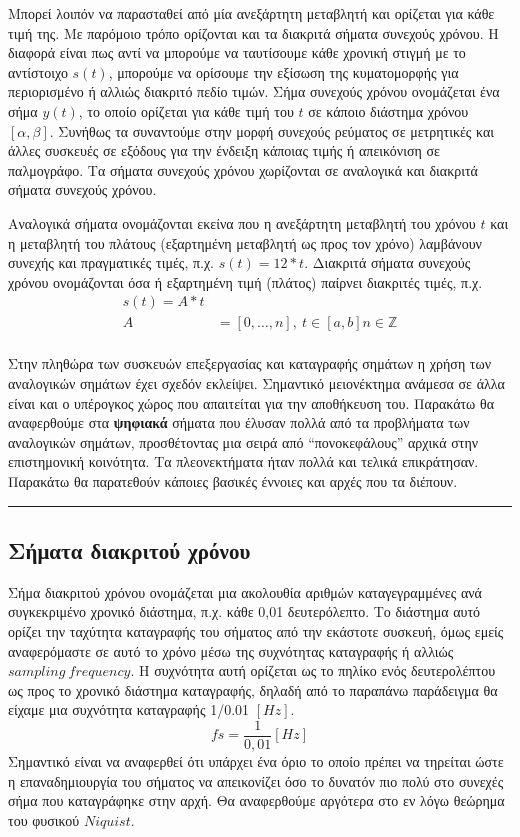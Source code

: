 \documentclass[breaklines=true, 12pt]{article}
\begin{document}
Μπορεί λοιπόν να παρασταθεί από μία ανεξάρτητη μεταβλητή και ορίζεται για κάθε
τιμή της. Με παρόμοιο τρόπο ορίζονται και τα διακριτά σήματα συνεχούς χρόνου.
Η διαφορά είναι πως αντί να μπορούμε να ταυτίσουμε κάθε χρονική στιγμή με το
αντίστοιχο \(s(t)\), μπορούμε να ορίσουμε την εξίσωση της κυματομορφής για
περιορισμένο ή αλλιώς διακριτό πεδίο τιμών. Σήμα συνεχούς χρόνου
ονομάζεται ένα σήμα \(y(t)\), το οποίο ορίζεται για κάθε τιμή του \(t\) σε κάποιο
διάστημα χρόνου \([\alpha,\beta]\). Συνήθως τα συναντούμε στην μορφή συνεχούς ρεύματος σε
μετρητικές και άλλες συσκευές σε εξόδους για την ένδειξη κάποιας τιμής ή
απεικόνιση σε παλμογράφο. Τα σήματα συνεχούς χρόνου χωρίζονται σε αναλογικά
και διακριτά σήματα συνεχούς χρόνου.

Αναλογικά σήματα ονομάζονται εκείνα που η ανεξάρτητη μεταβλητή του
χρόνου \(t\) και η μεταβλητή του πλάτους (εξαρτημένη μεταβλητή ως προς τον
χρόνο) λαμβάνουν συνεχής και πραγματικές τιμές, π.χ. \(s(t) = 12 * t\).
Διακριτά σήματα συνεχούς χρόνου ονομάζονται όσα ή εξαρτημένη τιμή
(πλάτος) παίρνει διακριτές τιμές, π.χ.
\begin{equation}
\begin{align}
s(t) =  A * t \\
A &= [0, … ,n],\ t \in [a,b] n \in \mathbb{Z} \\
\end{align}
\end{equation}

Στην πληθώρα των συσκευών επεξεργασίας και καταγραφής σημάτων η χρήση
των αναλογικών σημάτων έχει σχεδόν εκλείψει. Σημαντικό μειονέκτημα
ανάμεσα σε άλλα είναι και ο υπέρογκος χώρος που απαιτείται
για την αποθήκευση του. Παρακάτω θα αναφερθούμε στα \textbf{ψηφιακά} σήματα που
έλυσαν πολλά από τα προβλήματα των αναλογικών σημάτων, προσθέτοντας μια
σειρά από “πονοκεφάλους” αρχικά στην επιστημονική κοινότητα. Τα
πλεονεκτήματα ήταν πολλά και τελικά επικράτησαν. Παρακάτω θα παρατεθούν
κάποιες βασικές έννοιες και αρχές που τα διέπουν.

\noindent\rule{\textwidth}{0.5pt}
\subsection{Σήματα διακριτού χρόνου}
\label{sec:org9fc30b3}
Σήμα διακριτού χρόνου ονομάζεται μια ακολουθία αριθμών καταγεγραμμένες
ανά συγκεκριμένο χρονικό διάστημα, π.χ. κάθε 0,01 δευτερόλεπτο. Το
διάστημα αυτό ορίζει την ταχύτητα καταγραφής του σήματος από την
εκάστοτε συσκευή, όμως εμείς αναφερόμαστε σε αυτό το χρόνο μέσω της
συχνότητας καταγραφής ή αλλιώς \({sampling\ frequency}\). Η συχνότητα αυτή
ορίζεται ως το πηλίκο ενός δευτερολέπτου ως προς το χρονικό διάστημα
καταγραφής, δηλαδή από το παραπάνω παράδειγμα θα είχαμε μια συχνότητα
καταγραφής 1/0.01 \([Hz]\).
\begin{equation}
fs = \frac{1}{0,01} [Hz]
\end{equation}
Σημαντικό είναι να αναφερθεί ότι υπάρχει ένα όριο το οποίο πρέπει να
τηρείται ώστε η επαναδημιουργία του σήματος να απεικονίζει όσο το
δυνατόν πιο πολύ στο συνεχές σήμα που καταγράφηκε στην αρχή. Θα
αναφερθούμε αργότερα στο εν λόγω θεώρημα του φυσικού \({Niquist}\).
\end{document}
